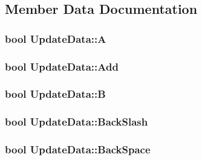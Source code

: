 \subsection{Member Data Documentation}
\hypertarget{class_update_data_a4cbd35c10d81c0e7212c25f92b42a835}{
\subsubsection[{A}]{\setlength{\rightskip}{0pt plus 5cm}bool Update\-Data\-::\-A\hspace{0.3cm}{\ttfamily [private]}}}\label{class_update_data_a4cbd35c10d81c0e7212c25f92b42a835}
\hypertarget{class_update_data_a6a9c2d7f99664d9c336cec57096532cc}{
\subsubsection[{Add}]{\setlength{\rightskip}{0pt plus 5cm}bool Update\-Data\-::\-Add\hspace{0.3cm}{\ttfamily [private]}}}\label{class_update_data_a6a9c2d7f99664d9c336cec57096532cc}
\hypertarget{class_update_data_a3d017300c67923eb5d8d8e8c2e2719c5}{
\subsubsection[{B}]{\setlength{\rightskip}{0pt plus 5cm}bool Update\-Data\-::\-B\hspace{0.3cm}{\ttfamily [private]}}}\label{class_update_data_a3d017300c67923eb5d8d8e8c2e2719c5}
\hypertarget{class_update_data_a01746887ddfef9f899756d51c8d32219}{
\subsubsection[{Back\-Slash}]{\setlength{\rightskip}{0pt plus 5cm}bool Update\-Data\-::\-Back\-Slash\hspace{0.3cm}{\ttfamily [private]}}}\label{class_update_data_a01746887ddfef9f899756d51c8d32219}
\hypertarget{class_update_data_a548f522f433fa5cf1297d278e7bfde43}{
\subsubsection[{Back\-Space}]{\setlength{\rightskip}{0pt plus 5cm}bool Update\-Data\-::\-Back\-Space\hspace{0.3cm}{\ttfamily [private]}}}\label{class_update_data_a548f522f433fa5cf1297d278e7bfde43}
